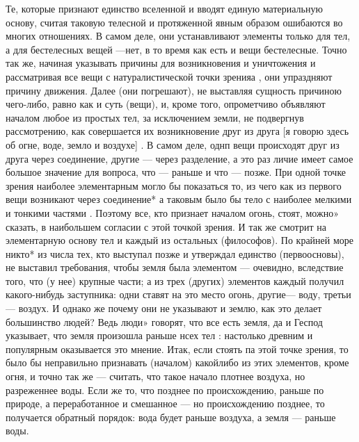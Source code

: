 \documentclass{article}
\begin{document}
Те, которые признают единство вселенной и вводят единую материальную основу, считая таковую телесной и протяженной явным образом ошибаются во многих отношениях. В самом деле, они устанавливают элементы только для тел, а для бестелесных вещей —нет, в то время как есть и вещи бестелесные. Точно так же, начиная указывать причины для возникновения и уничтожения и рассматривая все вещи с натуралистической точки зренияа , они упраздняют причину движения. Далее (они погрешают), не выставляя сущность причиною чего-либо, равно как и суть (вещи), и, кроме того, опрометчиво объявляют началом любое из простых тел, за исключением земли,
\footnotemark[1]
не подвергнув рассмотрению, как совершается их возникновение друг из друга [я говорю здесь об огне, воде, земло и воздухе] . В самом деле, однп вещи происходят друг из друга через соединение, другие — через разделение, а это раз личие имеет самое большое значение для вопроса, что — раньше и что — позже. При одной точке зрения наиболее элементарным могло бы показаться то, из чего как из первого вещи возникают через соединение* а таковым было бы тело с наиболее мелкими и тонкими частями . Поэтому все, кто признает началом огонь, стоят, можно» сказать, в наибольшем согласии с этой точкой зрения. И так же смотрит на элементарную основу тел и каждый из остальных (философов). По крайней море никто* из числа тех, кто выступал позже и утверждал единство (первоосновы), не выставил требования, чтобы земля была элементом — очевидно, вследствие того, что (у нее) крупные части; а из трех (других) элементов каждый получил какого-нибудь заступника: одни ставят на это место огонь, другие— воду, третьи — воздух. И однако же почему они не указывают и землю, как это делает большинство людей? Ведь люди» говорят, что все есть земля, да и Геспод указывает, что земля произошла раньше нсех тел : настолько древним и популярным оказывается это мнение. Итак, если стоять па этой точке зрения, то было бы неправильно признавать (началом) какойлибо из этих элементов, кроме огня, и точно так же — считать, что такое начало плотнее воздуха, но разреженнее воды. Если же то, что позднее по происхождению, раньше по природе, а переработанное и смешанное — но происхождению позднее, то получается обратный порядок: вода будет раньше воздуха, а земля — раньше воды.
\end{document}
